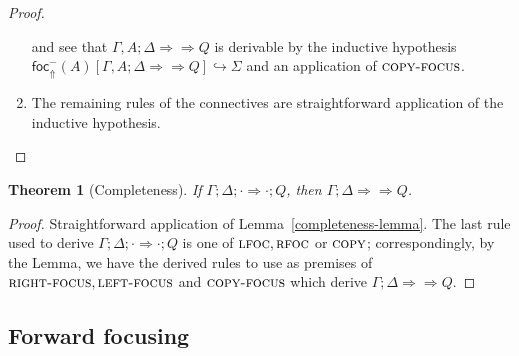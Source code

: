 \documentclass{article}
\newtheorem{theorem}{Theorem}
\newcommand{\neuseqsymb}{
  \mathrel{\Longrightarrow\!\!\!\!\!\!\!\!\Longrightarrow}
}
\newcommand{\neuseq}[3]{#1 ; #2 \neuseqsymb #3}
\newcommand{\blfrel}[1]{\textsf{foc}^-_{\Uparrow}(#1)}
\newcommand{\relj}[3]{#1 [#2] \hookrightarrow #3}
\newcommand{\btriseq}[4]{#1; #2; #3 \Longrightarrow #4}
\newcommand{\rfoc}{\textsc{rfoc}}
\newcommand{\lfoc}{\textsc{lfoc}}
\newcommand{\rightfocusrule}{\textsc{right-focus}}
\newcommand{\leftfocusrule}{\textsc{left-focus}}
\newcommand{\copyfocusrule}{\textsc{copy-focus}}
\newcommand{\copyrule}{\textsc{copy}}
\begin{document}
\begin{proof}
\begin{enumerate}
    and see that $\neuseq{\Gamma, A}{\Delta}{Q}$ is derivable by
    the inductive hypothesis
    $\relj{\blfrel{A}}{\neuseq{\Gamma,A}{\Delta}{Q}}{\Sigma}$ and an application
    of $\copyfocusrule$.
  \item The remaining rules of the connectives are straightforward application
    of the inductive hypothesis.
  \end{enumerate}
\end{proof}

\begin{theorem}[Completeness]
  If $\btriseq{\Gamma}{\Delta}{\cdot}{\cdot ; Q}$, then
  $\neuseq{\Gamma}{\Delta}{Q}$.
\end{theorem}
\begin{proof}
  Straightforward application of Lemma~\ref{completeness-lemma}. The last rule
  used to derive $\btriseq{\Gamma}{\Delta}{\cdot}{\cdot ; Q}$ is one of
  $\lfoc, \rfoc$ or $\copyrule$; correspondingly, by the Lemma, we have the
  derived rules to use as premises of $\rightfocusrule, \leftfocusrule$ and
  $\copyfocusrule$ which derive $\neuseq{\Gamma}{\Delta}{Q}$.
\end{proof}

\subsection{Forward focusing}
\end{document}
